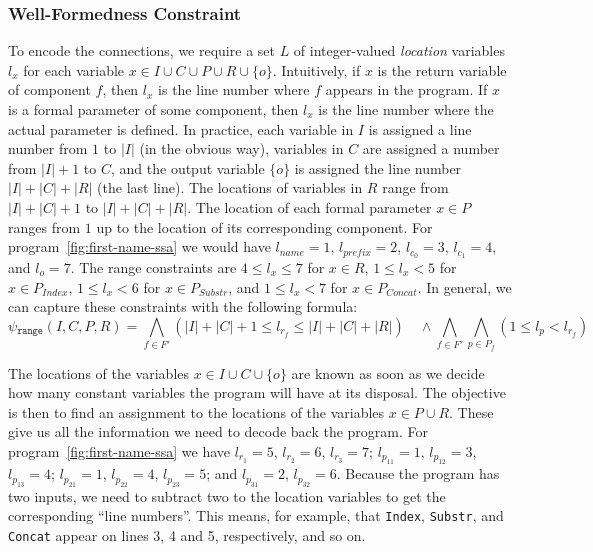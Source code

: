 \subsubsection{Well-Formedness Constraint}
\label{sec:wfp-constraint}

To encode the connections, we require a set $L$ of integer-valued
\textit{location} variables $l_x$ for each variable $x \in I \cup C \cup P \cup
R \cup \{o\}$. Intuitively, if $x$ is the return variable of component $f$, then
$l_x$ is the line number where $f$ appears in the program. If $x$ is a formal
parameter of some component, then $l_x$ is the line number where the actual
parameter is defined. In practice, each variable in $I$ is assigned a line
number from $1$ to $|I|$ (in the obvious way), variables in $C$ are assigned
a number from $|I| + 1$ to $C$, and the output variable $\{o\}$ is assigned the
line number $|I| + |C| + |R|$ (the last line). The locations of variables in $R$
range from $|I| + |C| + 1$ to $|I| + |C| + |R|$. The location of each formal
parameter $x \in P$ ranges from $1$ up to the location of its corresponding
component.
For program~\ref{fig:first-name-ssa} we would have
$l_{name} = 1$, $l_{prefix} = 2$,
$l_{c_0} = 3$, $l_{c_1} = 4$,
and $l_o = 7$.
The range constraints are
$4 \leq l_x \leq 7$ for $x \in R$,
$1 \leq l_x < 5$ for $x \in P_{Index}$,
$1 \leq l_x < 6$ for $x \in P_{Substr}$, and
$1 \leq l_x < 7$ for $x \in P_{Concat}$.
In general, we can capture these constraints with the following formula:
%
\[
  \psi{}_{\mathtt{range}}(I, C, P, R) =
  \bigwedge_{f \in F'} (|I| + |C| + 1 \leq l_{r_f} \leq |I| + |C| + |R|)
  \quad \wedge
  \bigwedge_{f \in F'}
  \bigwedge_{p \in P_f} (1 \leq l_p < l_{r_f})
\]

The locations of the variables $x \in I \cup C \cup \{o\}$ are known as soon as
we decide how many constant variables the program will have at its disposal. The
objective is then to find an assignment to the locations of the variables $x \in
P \cup R$. These give us all the information we need to decode back the program.
For program~\ref{fig:first-name-ssa} we have
$l_{r_1} = 5$, $l_{r_2} = 6$, $l_{r_3} = 7$; $l_{p_{11}} = 1$, $l_{p_{12}} = 3$,
$l_{p_{13}} = 4$; $l_{p_{21}} = 1$, $l_{p_{22}} = 4$, $l_{p_{23}} = 5$; and
$l_{p_{31}} = 2$, $l_{p_{32}} = 6$. Because the program has two inputs, we need
to subtract two to the location variables to get the corresponding ``line
numbers''. This means, for example, that \lstinline{Index}, \lstinline{Substr},
and \lstinline{Concat} appear on lines 3, 4 and 5, respectively, and so on.

